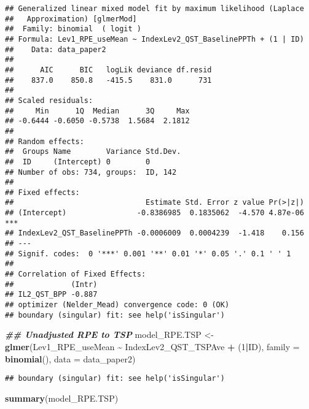 \documentclass[
  12pt,
]{article}
\newenvironment{Shaded}{\begin{snugshade}}{\end{snugshade}}
\newcommand{\AttributeTok}[1]{\textcolor[rgb]{0.13,0.29,0.53}{#1}}
\newcommand{\DecValTok}[1]{\textcolor[rgb]{0.00,0.00,0.81}{#1}}
\newcommand{\DocumentationTok}[1]{\textcolor[rgb]{0.56,0.35,0.01}{\textbf{\textit{#1}}}}
\newcommand{\FunctionTok}[1]{\textcolor[rgb]{0.13,0.29,0.53}{\textbf{#1}}}
\newcommand{\NormalTok}[1]{#1}
\newcommand{\OtherTok}[1]{\textcolor[rgb]{0.56,0.35,0.01}{#1}}
\newcommand{\SpecialCharTok}[1]{\textcolor[rgb]{0.81,0.36,0.00}{\textbf{#1}}}
\begin{document}
\begin{verbatim}
## Generalized linear mixed model fit by maximum likelihood (Laplace
##   Approximation) [glmerMod]
##  Family: binomial  ( logit )
## Formula: Lev1_RPE_useMean ~ IndexLev2_QST_BaselinePPTh + (1 | ID)
##    Data: data_paper2
## 
##      AIC      BIC   logLik deviance df.resid 
##    837.0    850.8   -415.5    831.0      731 
## 
## Scaled residuals: 
##     Min      1Q  Median      3Q     Max 
## -0.6444 -0.6050 -0.5738  1.5684  2.1812 
## 
## Random effects:
##  Groups Name        Variance Std.Dev.
##  ID     (Intercept) 0        0       
## Number of obs: 734, groups:  ID, 142
## 
## Fixed effects:
##                              Estimate Std. Error z value Pr(>|z|)    
## (Intercept)                -0.8386985  0.1835062  -4.570 4.87e-06 ***
## IndexLev2_QST_BaselinePPTh -0.0006009  0.0004239  -1.418    0.156    
## ---
## Signif. codes:  0 '***' 0.001 '**' 0.01 '*' 0.05 '.' 0.1 ' ' 1
## 
## Correlation of Fixed Effects:
##             (Intr)
## IL2_QST_BPP -0.887
## optimizer (Nelder_Mead) convergence code: 0 (OK)
## boundary (singular) fit: see help('isSingular')
\end{verbatim}

\begin{Shaded}
\begin{Highlighting}[]
\DocumentationTok{\#\# Unadjusted RPE to TSP}
\NormalTok{model\_RPE.TSP }\OtherTok{\textless{}{-}} \FunctionTok{glmer}\NormalTok{(Lev1\_RPE\_useMean }\SpecialCharTok{\textasciitilde{}}\NormalTok{ IndexLev2\_QST\_TSPAve }\SpecialCharTok{+}\NormalTok{ (}\DecValTok{1}\SpecialCharTok{|}\NormalTok{ID), }\AttributeTok{family =} \FunctionTok{binomial}\NormalTok{(), }\AttributeTok{data =}\NormalTok{ data\_paper2)}
\end{Highlighting}
\end{Shaded}

\begin{verbatim}
## boundary (singular) fit: see help('isSingular')
\end{verbatim}

\begin{Shaded}
\begin{Highlighting}[]
\FunctionTok{summary}\NormalTok{(model\_RPE.TSP)}
\end{Highlighting}
\end{Shaded}
\end{document}
